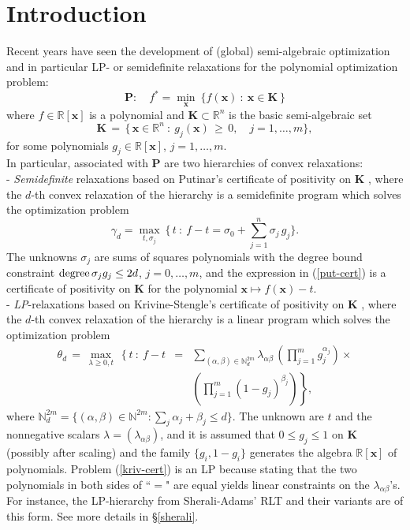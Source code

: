 \documentclass[11pt]{article}
\numberwithin{equation}{section}
\def\x{\mathbf{x}}
\def\R{\mathbb{R}}
\def\N{\mathbb{N}}
\def\K{\mathbf{K}}
\def\P{\mathbf{P}}
\begin{document}
\section{Introduction}

Recent years have seen the development of 
(global) semi-algebraic optimization and in particular 
LP- or semidefinite relaxations for the polynomial optimization problem:
\begin{equation}
\label{def-pb}
\P:\quad f^*=\displaystyle\min_\x\:\{f(\x)\::\: \x\in\K\:\}
\end{equation}
where $f\in\R[\x]$ is a polynomial and $\K\subset\R^n$ is the basic semi-algebraic set
\begin{equation}
\label{setk}
\K\,=\,\{\,\x\in\R^n\::\: g_j(\x)\,\geq\,0,\quad j=1,\ldots,m\},
\end{equation}
for some polynomials $g_j\in\R[\x]$, $j=1,\ldots,m$.\\

In particular, associated with $\P$ are two hierarchies of convex relaxations: \\

- {\it Semidefinite} relaxations based on Putinar's certificate of positivity on $\K$ \cite{Putinar93},
where the $d$-th convex relaxation of the hierarchy is a semidefinite program which solves
the optimization problem
\begin{equation}
\label{put-cert}
\gamma_d=\max_{t,\sigma_j}\:\{\,t\::\: f-t=\sigma_0+\sum_{j=1}^n \sigma_j\,g_j\}.
\end{equation}
The unknowns $\sigma_j$ are sums of squares polynomials with the degree bound constraint ${\rm degree}\,\sigma_jg_j\leq 2d$, $j=0,\ldots,m$,
and the expression  in (\ref{put-cert}) is a certificate of positivity on $\K$ for the polynomial $\x\mapsto f(\x)-t$.\\

- {\it LP}-relaxations based on Krivine-Stengle's certificate of positivity on $\K$ \cite{Krivine64a,Stengle74},
where the $d$-th convex relaxation of the hierarchy is a linear program which solves
the optimization problem
\begin{eqnarray}
\nonumber
\theta_d\,=\,\max_{\lambda\geq0,t}\:\left\{t\::\:
f-t\right.&=&\sum_{(\alpha,\beta)\in\N^{2m}_{d}}\lambda_{\alpha\beta}\,\left(\prod_{j=1}^mg_j^{\alpha_j}\right)\times\\
\label{kriv-cert}
&&\left.\left(\prod_{j=1}^m(1-g_j)^{\beta_j}\right)\right\},
\end{eqnarray}
where $\N^{2m}_{d}=\{(\alpha,\beta)\in\N^{2m}:\sum_j\alpha_j+\beta_j\leq d\}$. The unknown are $t$ and the nonnegative scalars $\lambda=(\lambda_{\alpha\beta})$, and
it is assumed that $0\leq g_j\leq 1$ on $\K$ (possibly after scaling) and the family $\{g_i,1-g_i\}$ generates the algebra $\R[\x]$ of polynomials.
Problem (\ref{kriv-cert}) is an LP because stating that the two polynomials in both sides of ``$=$" are equal yields linear constraints 
on the $\lambda_{\alpha\beta}$'s.
For instance, the LP-hierarchy from Sherali-Adams' RLT  \cite{SheraliAdams90} and their variants \cite{SheraliAdams99} are of this form.
See more details in \S \ref{sherali}.
\end{document}
